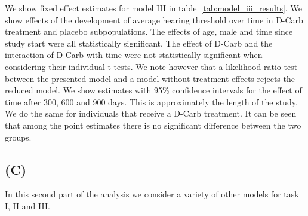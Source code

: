 \documentclass[paper=a4, fontsize=11pt]{scrartcl} %
\numberwithin{equation}{section} %
\numberwithin{figure}{section} %
\numberwithin{table}{section} %
\begin{document}
We show fixed effect estimates for model III in table~\ref{tab:model_iii_results}. We show effects of the development of average hearing threshold over time in D-Carb treatment and placebo subpopulations. The effects of age, male and time since study start were all statistically significant. The effect of D-Carb and the interaction of D-Carb with time were not statistically significant when considering their individual t-tests. We note however that a likelihood ratio test between the presented model and a model without treatment effects rejects the reduced model. We show estimates with 95\% confidence intervals for the effect of time after 300, 600 and 900 days. This is approximately the length of the study. We do the same for individuals that receive a D-Carb treatment. It can be seen that among the point estimates there is no significant difference between the two groups.


\subsection{(C)}
In this second part of the analysis we consider a variety of other models for task I, II and III.

\end{document}
